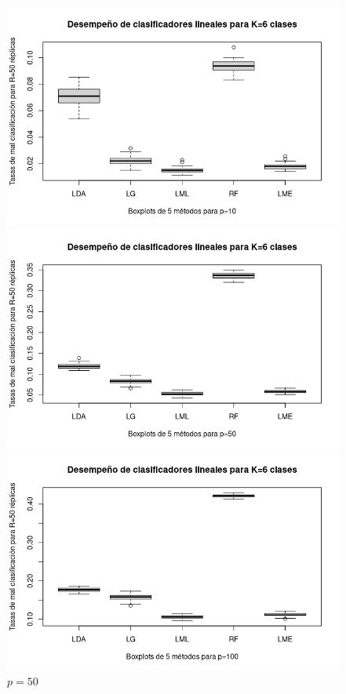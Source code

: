 \documentclass{report}
\begin{document}
  
  \begin{figure} [h]
  	\begin{multicols}{2}
  		\includegraphics[width=\linewidth]{6_clases_p10_sigma_I}\par 
  		\caption*{$p=10$}
  		\includegraphics[width=\linewidth]{6_clases_p50_sigma_I}\par 
  		\caption*{$p=50$}	 
  	\end{multicols}
  	\begin{multicols}{2}
  		\includegraphics[width=\linewidth]{6_clases_p100_sigma_I}\par

\end{multicols}
\end{figure}
\end{document}
